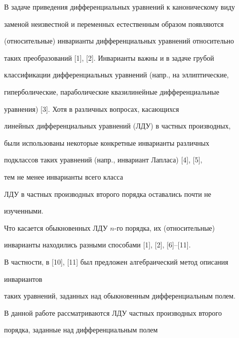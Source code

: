  




\maketitle 


\label{begin} 


 


В задаче приведения дифференциальных уравнений к каноническому виду 


заменой неизвестной и переменных естественным образом появляются  


(относительные) инварианты дифференциальных уравнений относительно  


таких преобразований [1], [2]. Инварианты важны и в задаче грубой 


классификации дифференциальных уравнений (напр., на эллиптические, 


гиперболические, параболические квазилинейные дифференциальные 


уравнения) [3]. Хотя в различных вопросах, касающихся 


линейных дифференциальных уравнений (ЛДУ) в частных производных,


были использованы некоторые конкретные инварианты различных  


подклассов таких уравнений (напр., инвариант Лапласа) [4], [5], 


тем не менее инварианты всего класса  


ЛДУ в частных производных второго порядка оставались почти не  


изученными. 


 


Что касается обыкновенных ЛДУ $n$-го порядка, их (относительные)  


инварианты находились разными способами [1], [2], [6]--[11]. 


В частности, в [10], [11] был предложен алгебраический метод описания 


инвариантов  


таких уравнений, заданных над обыкновенным дифференциальным полем.  


 


В данной работе рассматриваются ЛДУ частных производных второго 


порядка, заданные над дифференциальным полем 


